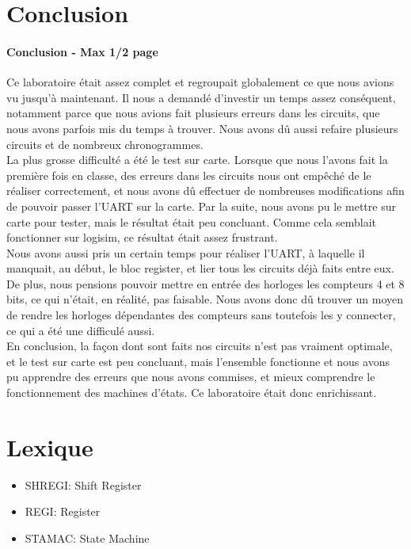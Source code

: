 \documentclass[a4paper]{article} %
\begin{document}
\section {Conclusion}
\begin{tcolorbox}[colframe=Monokaimagenta,colback=white]
\paragraph{Conclusion - Max 1/2 page}
Ce laboratoire était assez complet et regroupait globalement ce que nous avions vu jusqu'à maintenant. Il nous a demandé d'investir un temps assez conséquent, notamment parce que nous avions fait plusieurs erreurs dans les circuits, que nous avons parfois mis du temps à trouver. Nous avons dû aussi refaire plusieurs circuits et de nombreux chronogrammes.\\
La plus grosse difficulté a été le test sur carte. Lorsque que nous l'avons fait la première fois en classe, des erreurs dans les circuits nous ont empêché de le réaliser correctement, et nous avons dû effectuer de nombreuses modifications afin de pouvoir passer l'UART sur la carte. Par la suite, nous avons pu le mettre sur carte pour tester, mais le résultat était peu concluant. Comme cela semblait fonctionner sur logisim, ce résultat était assez frustrant.\\
Nous avons aussi pris un certain temps pour réaliser l'UART, à laquelle il manquait, au début, le bloc register, et lier tous les circuits déjà faits entre eux. De plus, nous pensions pouvoir mettre en entrée des horloges les compteurs 4 et 8 bits, ce qui n'était, en réalité, pas faisable. Nous avons donc dû trouver un moyen de rendre les horloges dépendantes des compteurs sans toutefois les y connecter, ce qui a été une difficulé aussi.\\
En conclusion, la façon dont sont faits nos circuits n'est pas vraiment optimale, et le test sur carte est peu concluant, mais l'ensemble fonctionne et nous avons pu apprendre des erreurs que nous avons commises, et mieux comprendre le fonctionnement des machines d'états. Ce laboratoire était donc enrichissant.

\end{tcolorbox}

\section{Lexique}
\begin{itemize}
    \item     SHREGI: Shift Register
    \item     REGI: Register
    \item     STAMAC: State Machine
\end{itemize}
\end{document}
